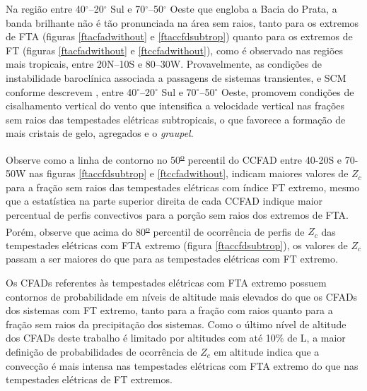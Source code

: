 Na região entre 40$^{\circ}$--20$^{\circ}$ Sul e 70$^{\circ}$--50$^{\circ}$ Oeste que engloba a Bacia do Prata, a banda brilhante não é tão pronunciada na área sem raios, tanto para os extremos de FTA (figuras \ref{ftacfadwithout} e \ref{ftaccfdsubtrop}) quanto para os extremos de FT (figuras \ref{ftacfadwithout} e \ref{ftccfadwithout}), como é observado nas regiões mais tropicais, entre 20N--10S e 80--30W. Provavelmente, as condições de instabilidade baroclínica associada a passagens de sistemas transientes, e SCM conforme descrevem , entre 40$^{\circ}$--20$^{\circ}$ Sul e 70$^{\circ}$--50$^{\circ}$ Oeste, promovem condições de cisalhamento vertical do vento que intensifica a velocidade vertical nas frações sem raios das tempestades elétricas subtropicais, o que favorece a formação de mais cristais de gelo, agregados e o \textit{graupel}.

Observe como a linha de contorno no 50\textsuperscript{\underline{o}} percentil do CCFAD entre 40-20S e 70-50W nas figuras \ref{ftaccfdsubtrop} e \ref{ftccfadwithout}, indicam maiores valores de $Z_c$ para a fração sem raios das tempestades elétricas com índice FT extremo, mesmo que a estatística na parte superior direita de cada CCFAD indique maior percentual de perfis convectivos para a porção sem raios dos extremos de FTA. Porém, observe que acima do 80\textsuperscript{\underline{o}} percentil de ocorrência de perfis de $Z_c$ das tempestades elétricas com FTA extremo (figura \ref{ftaccfdsubtrop}), os valores de $Z_c$ passam a ser maiores do que para as tempestades elétricas com FT extremo. 



Os CFADs referentes às tempestades elétricas com FTA extremo possuem contornos de probabilidade em níveis de altitude mais elevados do que os CFADs dos sistemas com FT extremo, tanto para a fração com raios quanto para a fração sem raios da precipitação dos sistemas. Como o último nível de altitude dos CFADs deste trabalho é limitado por altitudes com até 10\% de L, a maior definição de probabilidades de ocorrência de $Z_c$ em altitude indica que a convecção é mais intensa nas tempestades elétricas com FTA extremo do que nas tempestades elétricas de FT extremos.

